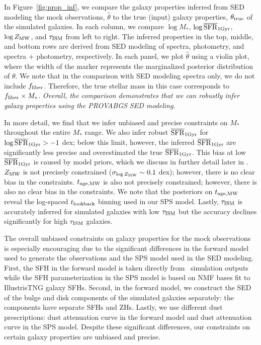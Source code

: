 In Figure~\ref{fig:prop_inf}, we compare the galaxy properties inferred from
SED modeling the mock observations, $\hat{\theta}$ to the true (input) galaxy
properties, $\theta_{\rm true}$ of the simulated galaxies.
In each column, we compare $\log M_*$, $\log \overline{\rm SFR}_{\rm 1Gyr}$, $\log Z_{\rm MW}$, and
$\tau_{\rm ISM}$ from left to right. 
The inferred properties in the top, middle, and bottom rows are derived from
SED modeling of spectra, photometry, and spectra + photometry, respectively.
In each panel, we plot $\hat{\theta}$ using a violin plot, where the width
of the marker represents the marginalized posterior distribution of $\theta$. 
We note that in the comparison with SED modeling spectra only, we do not
include $f_{\rm fiber}$. 
Therefore, the true stellar mass in this case corresponds to $f_{\rm fiber}
\times M_*$. 
\emph{Overall, the comparison demonstrates that we can robustly infer galaxy
properties using the {\sc PROVABGS} SED modeling}. 

In more detail, we find that we infer unbiased and precise constraints on
$M_*$ throughout the entire $M_*$ range. 
We also infer robust $\overline{\rm SFR}_{\rm 1Gyr}$ for $\log \overline{\rm SFR}_{\rm 1Gyr} > -1$ dex; below this limit,
however, the inferred $\overline{\rm SFR}_{\rm 1Gyr}$ are significantly less precise and
overestimated the true $\overline{\rm SFR}_{\rm 1Gyr}$. 
This bias at low $\overline{\rm SFR}_{\rm 1Gyr}$ is caused by model priors, which we discuss in
further detail later in . 
$Z_{\rm MW}$ is not precisely constrained ($\sigma_{\log Z_{\rm MW}} \sim 0.1$
dex); however, there is no clear bias in the constraints. 
$t_{\rm age, MW}$ is also not precisely constrained; however, there is also no clear bias
in the constraints. 
We note that the posteriors on $t_{\rm age, MW}$ reveal the log-spaced $t_{\rm lookback}$ binning
used in our SPS model.
Lastly, $\tau_{\rm ISM}$ is accurately inferred for simulated galaxies with
low $\tau_{\rm ISM}$ but the accuracy declines significantly for high 
$\tau_{\rm ISM}$ galaxies. 

The overall unbiased constraints on galaxy properties for the mock observations
is especially encouraging due to the significant differences in the forward
model used to generate the observations and the SPS model used in the SED
modeling. 
First, the SFH in the forward model is taken directly from \lgal~simulation
outputs while the SFH parameterization in the SPS model is based on NMF bases fit
to IllustrisTNG galaxy SFHs.
Second, in the forward model, we construct the SED of the bulge and disk
components of the simulated galaxies separately: the components have separate
SFHs and ZHs. 
Lastly, we use different dust prescriptions: \cite{mathis1983} dust attenuation  
curve in the forward model and \cite{kriek2013} dust attenuation curve in the
SPS model. 
Despite these significant differences, our constraints on certain galaxy
properties are unbiased and precise. 

